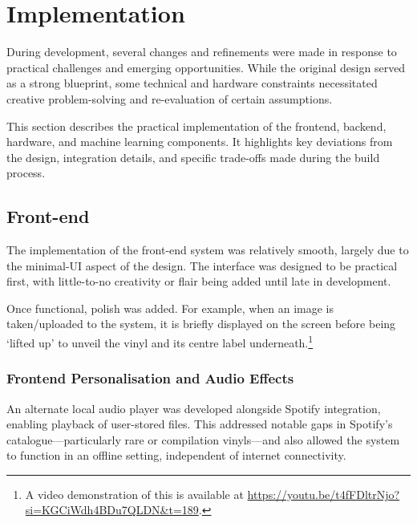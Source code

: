     \section{Implementation}
    
        During development, several changes and refinements were made in response to practical challenges and emerging opportunities. While the original design served as a strong blueprint, some technical and hardware constraints necessitated creative problem-solving and re-evaluation of certain assumptions.
    
        This section describes the practical implementation of the frontend, backend, hardware, and machine learning components. It highlights key deviations from the design, integration details, and specific trade-offs made during the build process.
    
        \subsection{Front-end}
    
    
            The implementation of the front-end system was relatively smooth, largely due to the minimal-UI aspect of the design. The interface was designed to be practical first, with little-to-no creativity or flair being added until late in development.
    
            Once functional, polish was added. For example, when an image is taken/uploaded to the system, it is briefly displayed on the screen before being `lifted up' to unveil the vinyl and its centre label underneath.\footnote{A video demonstration of this is available at \url{https://youtu.be/t4fFDltrNjo?si=KGCiWdh4BDu7QLDN&t=189}.}
    
            \subsubsection{Frontend Personalisation and Audio Effects}
    
            An alternate local audio player was developed alongside Spotify integration, enabling playback of user-stored files. This addressed notable gaps in Spotify’s catalogue—particularly rare or compilation vinyls—and also allowed the system to function in an offline setting, independent of internet connectivity.
    
